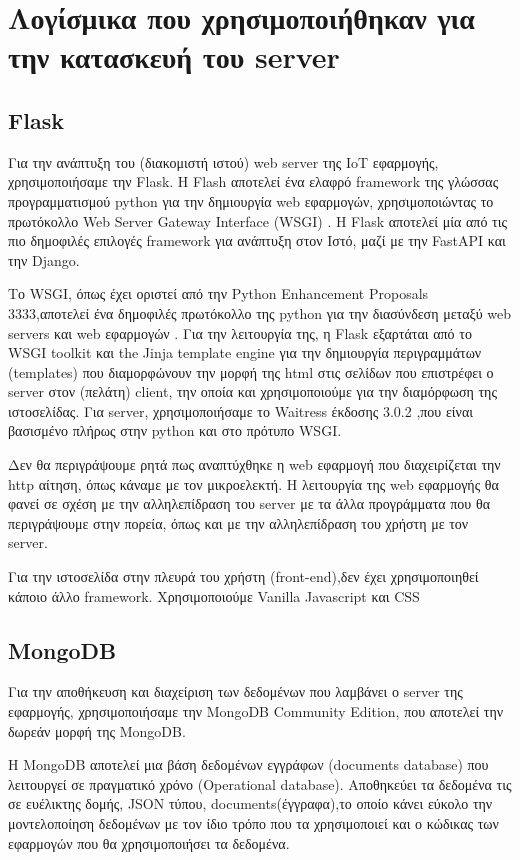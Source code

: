 \section{Λογίσμικα που χρησιμοποιήθηκαν για την κατασκευή του server}

\subsection{Flask}

Για την ανάπτυξη του (διακομιστή ιστού) web server της IoT εφαρμογής, χρησιμοποιήσαμε την Flask.
Η Flash αποτελεί ένα ελαφρό framework της γλώσσας προγραμματισμού python 
για την δημιουργία web εφαρμογών, χρησιμοποιώντας το πρωτόκολλο Web Server Gateway Interface (WSGI) \cite{Flask}.
Η Flask αποτελεί μία από τις πιο δημοφιλές επιλογές framework για ανάπτυξη στον Ιστό,
μαζί με την FastAPI και την Django\cite{jetbrainsPopular}.

Το WSGI, όπως έχει οριστεί από την Python Enhancement Proposals 3333,αποτελεί ένα δημοφιλές πρωτόκολλο της python για την διασύνδεση μεταξύ web servers και web εφαρμογών \cite{PEP3333}.
Για την λειτουργία της, η Flask εξαρτάται από το WSGI toolkit και the Jinja template engine για την δημιουργία περιγραμμάτων (templates)
που διαμορφώνουν την μορφή της html στις σελίδων που επιστρέφει ο server στον (πελάτη) client, την οποία και χρησιμοποιούμε για την διαμόρφωση της ιστοσελίδας.
Για server, χρησιμοποιήσαμε το Waitress έκδοσης 3.0.2 \cite{waitress},που είναι βασισμένο πλήρως στην python και στο πρότυπο WSGI.

Δεν θα περιγράψουμε ρητά πως αναπτύχθηκε η web εφαρμογή που διαχειρίζεται την http αίτηση, όπως κάναμε με τον μικροελεκτή. 
Η λειτουργία της web εφαρμογής θα φανεί σε σχέση με την αλληλεπίδραση του server με τα άλλα προγράμματα που θα περιγράψουμε στην πορεία,
όπως και με την αλληλεπίδραση του χρήστη με τον server.

Για την ιστοσελίδα στην πλευρά του χρήστη (front-end),δεν έχει χρησιμοποιηθεί κάποιο άλλο framework.
Χρησιμοποιούμε Vanilla Javascript και CSS

\subsection{MongoDB}

Για την αποθήκευση και διαχείριση των δεδομένων που λαμβάνει ο server της εφαρμογής, χρησιμοποιήσαμε την MongoDB Community Edition,
που αποτελεί την δωρεάν μορφή της MongoDB.

Η MongoDB αποτελεί μια βάση δεδομένων εγγράφων (documents database) που λειτουργεί σε πραγματικό χρόνο (Operational database).
Αποθηκεύει τα δεδομένα τις σε ευέλικτης δομής, JSON τύπου, documents(έγγραφα),το οποίο κάνει εύκολο την μοντελοποίηση δεδομένων με τον ίδιο τρόπο 
που τα χρησιμοποιεί και ο κώδικας των εφαρμογών που θα χρησιμοποιήσει τα δεδομένα.


